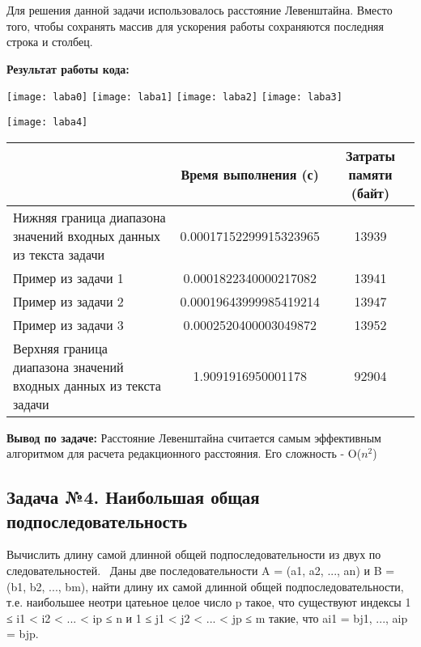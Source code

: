 \begin{code}
	\inputminted[breaklines=true, xleftmargin=1em, linenos, frame=single, framesep=10pt, fontsize=\footnotesize, firstline=1, lastline=33]{haskell}{listings/3.py}
\end{code}
Для решения данной задачи использовалось расстояние Левенштайна. Вместо того, чтобы сохранять массив для ускорения работы сохраняются последняя строка и столбец.
\newline

\textbf{Результат работы кода:}

\begin{center}
\texttt{[image: laba0]}
\texttt{[image: laba1]}
\texttt{[image: laba2]}
\texttt{[image: laba3]}
\vspace*{1cm}

\texttt{[image: laba4]}
\end{center}
\newpage
\begin{tabular}{|p{4cm}|c|c|}
    \hline
     & Время выполнения (с) & Затраты памяти (байт) \\ \hline
    Нижняя граница диапазона значений входных данных из текста задачи & 0.00017152299915323965 & 13939 \\ \hline
    Пример из задачи 1 & 0.0001822340000217082 & 13941 \\ \hline
    Пример из задачи 2 & 0.00019643999985419214 & 13947 \\ \hline
    Пример из задачи 3 & 0.0002520400003049872 & 13952 \\ \hline
    Верхняя граница диапазона значений входных данных из текста задачи & 1.9091916950001178 & 92904 \\ \hline
\end{tabular}
\vspace*{0.5cm}
\newline
\textbf{Вывод по задаче:} Расстояние Левенштайна считается самым эффективным алгоритмом для расчета редакционного расстояния. Его сложность - O(\(n^2\))

\subsection{Задача №4. Наибольшая общая подпоследовательность}
Вычислить длину самой длинной общей подпоследовательности из двух по следовательностей. 
Даны две последовательности A = (a1, a2, ..., an) и B = (b1, b2, ..., bm), найти длину их самой длинной общей подпоследовательности, т.е. наибольшее неотри цатеьное целое число p такое, что существуют индексы 1 ≤ i1 < i2 < ... < ip ≤ n и 1 ≤ j1 < j2 < ... < jp ≤ m такие, что ai1 = bj1, ..., aip = bjp. 

